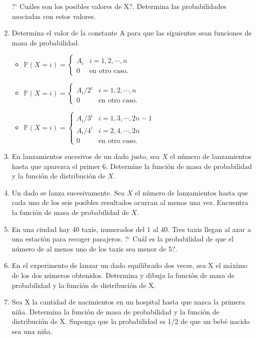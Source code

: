 \documentclass[a4paper,10pt]{report}
\begin{document}
\begin{enumerate}
?` Cu\'ales son los posibles valores de X?. Determina las probabilidades asociadas con estos valores.
\item Determina el valor de la constante A para que las siguientes sean funciones de masa de probabilidad.
\begin{itemize}
	\item $ \mathbb{P}(X = i) = \left\{\begin{matrix}
	A_i& i = 1, 2,\cdots , n\\
	0 & \text{en otro caso}.
	\end{matrix} \right.$		
	\item $\mathbb{P}(X = i) = \left\{\begin{matrix}
	A_i/2^i& i = 1, 2,\cdots , n\\
	0 & \text{en otro caso}.
	\end{matrix} \right.$
	\item $\mathbb{P}(X = i) = \left\{\begin{matrix}
	A_i/3^i& i = 1, 3,\cdots , 2n-1\\
	A_i/4^i& i = 2, 4,\cdots , 2n\\
	0 & \text{en otro caso}.
	\end{matrix} \right.$
\end{itemize}
\item En lanzamientos  sucesivos de un dado justo, sea $X$ el n\'umero de lanzamientos hasta que aparezca el primer $6$. Determine la funci\'on de masa de probabilidad y la funci\'on de distribuci\'on de  $X$.

\item Un dado  se lanza sucesivamente. Sea $X$ el n\'umero de lanzamientos hasta que cada uno de los seis posibles resultados ocurran al menos una vez. Encuentra la funci\'on de masa de probabilidad de $X$.

\item En una ciudad hay $40$ taxis, numerados del  $1$ al  $40$. Tres taxis llegan al azar a  una estaci\'on para recoger pasajeros. ?` Cu\'al es la probabilidad de que el n\'umero de al menos uno de los taxis sea menor de 5?.

\item En el experimento de lanzar un dado equilibrado dos veces, sea X el m\'aximo de los dos n\'umeros obtenidos. Determina y dibuja la funci\'on de masa de probabilidad y la funci\'on de distribuci\'on de X.
\item Sea X la cantidad de nacimientos en un hospital hasta que nazca la primera ni\~na. Determina la funci\'on de masa de probabilidad y la funci\'on de distribuci\'on de X. Suponga que la probabilidad es 1/2 de que un beb\'e nacido sea una ni\~na.
\end{enumerate}
\end{document}
